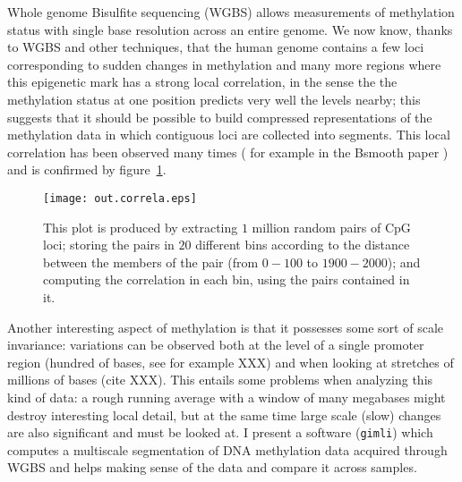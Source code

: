 \documentclass[11pt]{amsart}
\newcommand{\gimli}{\texttt{gimli}}
\begin{document}
Whole genome Bisulfite sequencing (WGBS) allows measurements of methylation 
status with single base resolution across an entire genome. We now know,
thanks to WGBS and other techniques,  
that the human genome contains a few loci corresponding to sudden changes in methylation 
and many more regions where this epigenetic mark has a strong local
correlation, in the sense the the methylation status at one position predicts 
very well the levels nearby; this suggests that it should be possible
to build compressed representations of the methylation data in which contiguous loci 
are collected into segments.
This local correlation has been observed many times ( for example
in the Bsmooth paper \cite{bsmooth}) and is confirmed by 
figure~\ref{corr}. 

\begin{center}
\begin{figure}\label{corr}
\texttt{[image: out.correla.eps]}
\caption{This plot is produced by extracting $1$ million random pairs of CpG loci;
storing the pairs in $20$ different bins  according to the distance between the members
of the pair (from $0-100$ to $1900-2000$); and computing the correlation in each bin,
using the pairs contained in it.}
\end{figure}
\end{center}

Another interesting aspect of methylation is that it possesses some sort of scale 
invariance: variations can be observed both at the level of a single promoter
region (hundred of bases, see for example XXX) and when looking at stretches
of millions of bases (cite XXX).
This entails some problems when analyzing this kind of data: a rough
running average with a window of many megabases might destroy interesting
local detail, but at the same time large scale (slow) changes are also
significant and must be looked at.
I present  a software (\gimli) which computes a multiscale segmentation 
of DNA methylation 
data acquired through WGBS and helps making sense of the data and compare 
it across samples.
\end{document}
